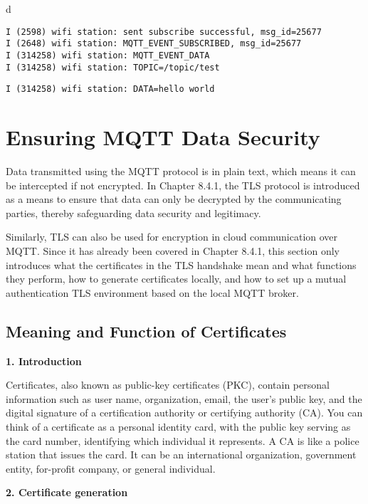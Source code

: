 \documentclass[a4paper,12pt]{book}
\begin{document}
\begin{codebloc}
\begin{tabular}{d}
\vspace{2pt}
\begin{verbatim}
I (2598) wifi station: sent subscribe successful, msg_id=25677
I (2648) wifi station: MQTT_EVENT_SUBSCRIBED, msg_id=25677
I (314258) wifi station: MQTT_EVENT_DATA
I (314258) wifi station: TOPIC=/topic/test
\end{verbatim}
\verb|I (314258) wifi station: DATA=hello world|
\end{tabular}
\end{codebloc}

\section{Ensuring MQTT Data Security}
Data transmitted using the MQTT protocol is in plain text, which means it can be intercepted if not encrypted. In Chapter 8.4.1, the TLS protocol is introduced as a means to ensure that data can only be decrypted by the communicating parties, thereby safeguarding data security and legitimacy.

Similarly, TLS can also be used for encryption in cloud communication over MQTT. Since it has already been covered in Chapter 8.4.1, this section only introduces what the certificates in the TLS handshake mean and what functions they perform, how to generate certificates locally, and how to set up a mutual authentication TLS environment based on the local MQTT broker.

\subsection{Meaning and Function of Certificates}
\textbf{1.	Introduction}

Certificates, also known as public-key certificates (PKC), contain personal information such as user name, organization, email, the user’s public key, and the digital signature of a certification authority or certifying authority (CA). You can think of a certificate as a personal identity card, with the public key serving as the card number, identifying which individual it represents. A CA is like a police station that issues the card. It can be an international organization, government entity, for-profit company, or general individual.

\textbf{2.	Certificate generation}
\end{document}

